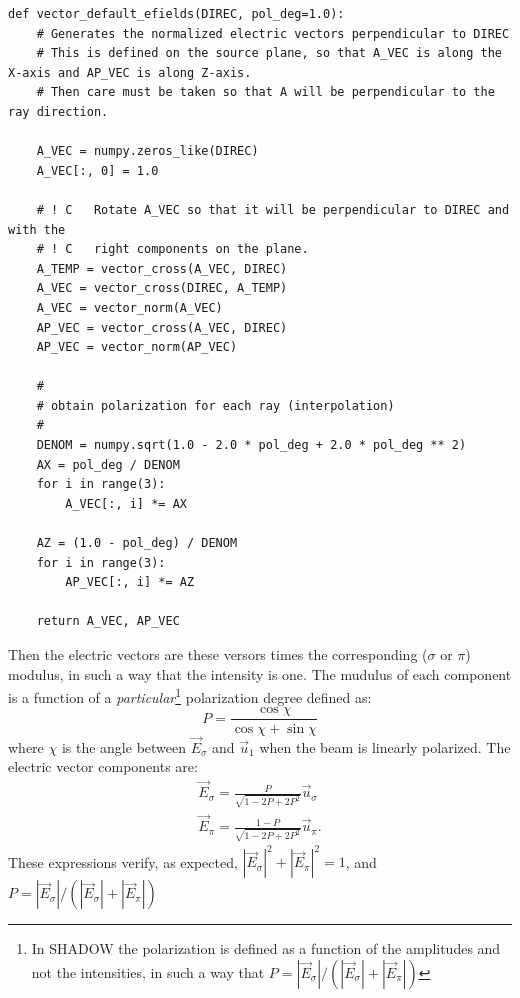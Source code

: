 \documentclass{iucr}
\begin{document}
\begin{lstlisting}[caption={\it Function {\tt vector\_default\_efields} used to create electric vectors $\sigma$ and $\pi$ perpendicular to a given direction and with a given polarization dregree}, label={lst:vectordefaultefields}, captionpos=b]
def vector_default_efields(DIREC, pol_deg=1.0):
    # Generates the normalized electric vectors perpendicular to DIREC
    # This is defined on the source plane, so that A_VEC is along the X-axis and AP_VEC is along Z-axis.
    # Then care must be taken so that A will be perpendicular to the ray direction.

    A_VEC = numpy.zeros_like(DIREC)
    A_VEC[:, 0] = 1.0

    # ! C   Rotate A_VEC so that it will be perpendicular to DIREC and with the
    # ! C   right components on the plane.
    A_TEMP = vector_cross(A_VEC, DIREC)
    A_VEC = vector_cross(DIREC, A_TEMP)
    A_VEC = vector_norm(A_VEC)
    AP_VEC = vector_cross(A_VEC, DIREC)
    AP_VEC = vector_norm(AP_VEC)

    #
    # obtain polarization for each ray (interpolation)
    #
    DENOM = numpy.sqrt(1.0 - 2.0 * pol_deg + 2.0 * pol_deg ** 2)
    AX = pol_deg / DENOM
    for i in range(3):
        A_VEC[:, i] *= AX

    AZ = (1.0 - pol_deg) / DENOM
    for i in range(3):
        AP_VEC[:, i] *= AZ

    return A_VEC, AP_VEC

\end{lstlisting} 

Then the electric vectors are these versors times the corresponding ($\sigma$ or $\pi$) modulus, in such a way that  the intensity is one. The mudulus of each component is a function of a {\it particular}\footnote{In SHADOW the polarization is defined as a function of the amplitudes and not the intensities, in such a way that $P=|\vec{E}_\sigma|/(|\vec{E}_\sigma|+|\vec{E}_\pi|)$} polarization degree defined as:
\begin{equation}
   P = \frac{\cos \chi}{\cos \chi + \sin \chi}
\end{equation}
where $\chi$ is the angle between $\vec{E}_\sigma$ and $\vec{u}_1$ when the beam is linearly polarized. 
The electric vector components are: 
\begin{eqnarray}
   \vec{E}_\sigma = \frac{P}{\sqrt{1-2 P+ 2 P^2}} \vec{u}_\sigma \nonumber \\
   \vec{E}_\pi    = \frac{1-P}{\sqrt{1-2 P+ 2 P^2}} \vec{u}_\pi.
\end{eqnarray}
These expressions verify, as expected,  $|\vec{E}_\sigma|^2 + |\vec{E}_\pi|^2 = 1$, and $P=|\vec{E}_\sigma|/(|\vec{E}_\sigma|+|\vec{E}_\pi|)$
\end{document}

